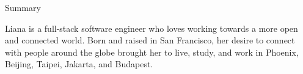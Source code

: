 \documentclass{resume} %
\begin{document}

\begin{rSection}{Summary}

Liana is a full-stack software engineer who loves working towards a more open and connected world. Born and raised in San Francisco, her desire to connect with people around the globe brought her to live, study, and work in Phoenix, Beijing, Taipei, Jakarta, and Budapest.

\end{rSection}

\end{document}
